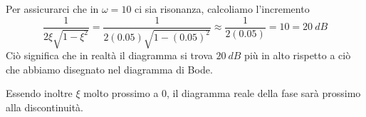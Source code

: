 \documentclass[10pt,a4paper]{book}
\begin{document}
Per assicurarci che in $\omega =10$ ci sia risonanza, calcoliamo l'incremento
\begin{equation*}
\frac{1}{2\xi \sqrt{1-\xi ^{2}}} =\frac{1}{2( 0.05)\sqrt{1-( 0.05)^{2}}} \approx \frac{1}{2( 0.05)} =10=20\ \si{dB}
\end{equation*}
Ciò significa che in realtà il diagramma si trova $20\ \si{dB}$ più in alto rispetto a ciò che abbiamo disegnato nel diagramma di Bode.

Essendo inoltre $\xi $ molto prossimo a $0$, il diagramma reale della fase sarà prossimo alla discontinuità.

\begin{figure}[htpb]
	\centering

	\begin{tikzpicture}[x=0.75pt,y=0.75pt,yscale=-1,xscale=1]


\end{tikzpicture}
\end{figure}
\end{document}
